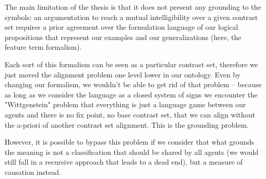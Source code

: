 The main limitation of the thesis is that it does not present any grounding to the symbols: an argumentation to reach a mutual intelligibility over a given contrast set requires a prior agreement over the formulation language of our logical propositions that represent our examples and our generalizations (here, the feature term formalism).

Each sort of this formalism can be seen as a particular contrast set, therefore we just moved the alignment problem one level lower in our ontology. Even by changing our formalism, we wouldn't be able to get rid of that problem -- because as long as we consider the language as a closed system of signs we encounter the "Wittgenstein" problem that everything is just a language game between our agents and there is no fix point, no base contrast set, that we can align without the a-priori of another contrast set alignment. This is the grounding problem.

However, it is possible to bypass this problem if we consider that what grounds the meaning is not a classification that should be shared by all agents (we would still fall in a recursive approach that leads to a dead end), but a measure of causation instead.